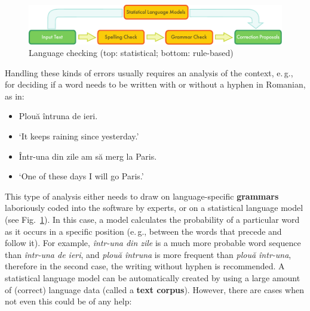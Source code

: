 \begin{multicols}{2}
\begin{figure}[htb]
\center
\includegraphics[width=\textwidth]{../_media/english/language_checking}
\caption{Language checking (top: statistical; bottom: rule-based)}
\label{fig:langcheckingaarch_en}
\end{figure}

Handling these kinds of errors usually requires an analysis of the context, e.\,g., for deciding if a word needs to be written with or without a hyphen in Romanian, as in:

\begin{example}
\begin{itemize}
\item[] Plouă întruna de ieri.
\item[] `It keeps raining since yesterday.'
\end{itemize}
\end{example}

\begin{example}
\begin{itemize}
\item[] Într-una din zile am să merg la Paris.
\item[] `One of these days I will go Paris.'
\end{itemize}
\end{example}

This type of analysis either needs to draw on language-specific \textbf{grammars} laboriously coded into the software by experts, or on a  statistical language model (see Fig.~\ref{fig:langcheckingaarch_en}). In this case, a model calculates the probability of a particular word as it occurs in a specific position (e.\,g., between the words that precede and follow it). For example, \textit{într-una din zile} is a much more probable word sequence than \textit{într-una de ieri}, and \textit{plouă întruna} is more frequent than \textit{plouă într-una}, therefore in the second case, the writing without hyphen is recommended. A statistical language model can be automatically created by using a large amount of (correct) language data (called a \textbf{text corpus}). However, there are cases when not even this could be of any help:


\end{multicols}
